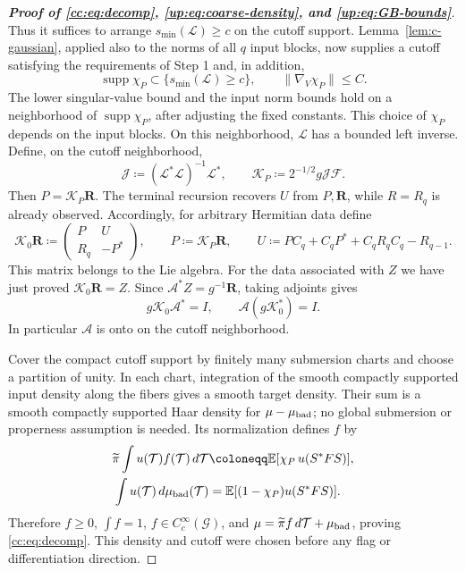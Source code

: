 \documentclass[11pt]{article}
\numberwithin{equation}{section}
\theoremstyle{remark}
\newcommand{\E}{\mathbb E}
\newcommand{\R}{\mathbb R}
\newcommand{\supp}{\operatorname{supp}}
\begin{document}
\begin{proof}[\textbf{Proof of \eqref{cc:eq:decomp}, \eqref{up:eq:coarse-density}, and \eqref{up:eq:GB-bounds}}]
Thus it suffices to arrange $s_{\min}(\mathcal L)\ge c$ on the
cutoff support. Lemma~\ref{lem:c-gaussian}, applied also to the norms
of all $q$ input blocks, now supplies a cutoff satisfying the
requirements of Step 1 and, in addition,
\[
 \supp\chi_P\subset\{s_{\min}(\mathcal L)\ge c\},\qquad
 \|\nabla_V\chi_P\|\le C.
\]
The lower singular-value bound and the input norm bounds hold on a
neighborhood of $\supp\chi_P$, after adjusting the fixed constants.
This choice of $\chi_P$ depends on the input blocks.
On this neighborhood, $\mathcal L$ has a bounded left inverse.
Define, on the cutoff neighborhood,
\[
 \mathcal J\coloneqq(\mathcal L^*\mathcal L)^{-1}\mathcal L^*,
 \qquad \mathcal K_P\coloneqq2^{-1/2} g\mathcal J\mathcal F.
\]
Then $P=\mathcal K_P\mathbf R$. The terminal recursion recovers
$U$ from $P,\mathbf R$, while $R=R_q$ is already observed. Accordingly,
for arbitrary Hermitian data define
\begin{equation}\label{eq:c-reconstruction}
 \mathcal K_0\mathbf R\coloneqq
 \begin{pmatrix}P&U\\R_q&-P^*\end{pmatrix},\qquad
 P\coloneqq\mathcal K_P\mathbf R,\qquad
 U\coloneqq PC_q+C_qP^*+C_qR_qC_q-R_{q-1}.
\end{equation}
This matrix belongs to the Lie algebra. For the data associated with
$Z$ we have just proved $\mathcal K_0\mathbf R=Z$.
Since $\mathcal A^*Z=g^{-1}\mathbf R$, taking adjoints gives
\begin{equation}\label{eq:c-right-inverse}
 g\mathcal K_0\mathcal A^*=I,\qquad
 \mathcal A(g\mathcal K_0^*)=I.
\end{equation}
In particular $\mathcal A$ is onto on the cutoff neighborhood.

Cover the compact cutoff support by finitely many submersion
charts and choose a partition of unity. In each chart, integration
of the smooth compactly supported input density along the fibers
gives a smooth target density. Their sum is a smooth compactly
supported Haar density for $\mu-\mu_{\rm bad}$; no global
submersion or properness assumption is needed. Its normalization defines
$f$ by
\begin{equation}\label{eq:c-cutoff-pushforward}
 \begin{aligned}
 \widetilde\pi\int u(\mathcal T)f(\mathcal T)\,d\mathcal T&\coloneqq\E[\chi_P\,u(S^*FS)],\\
 \int u(\mathcal T)\,d\mu_{\rm bad}(\mathcal T)&=\E[(1-\chi_P)u(S^*FS)].
 \end{aligned}
\end{equation}
Therefore $f\ge0$, $\int f=1$, $f\in C_c^\infty(\mathcal G)$,
and $\mu=\widetilde\pi f\,d\mathcal T+\mu_{\rm bad}$, proving
\eqref{cc:eq:decomp}. This density and cutoff were chosen before any
flag or differentiation direction.


\end{proof}
\end{document}

